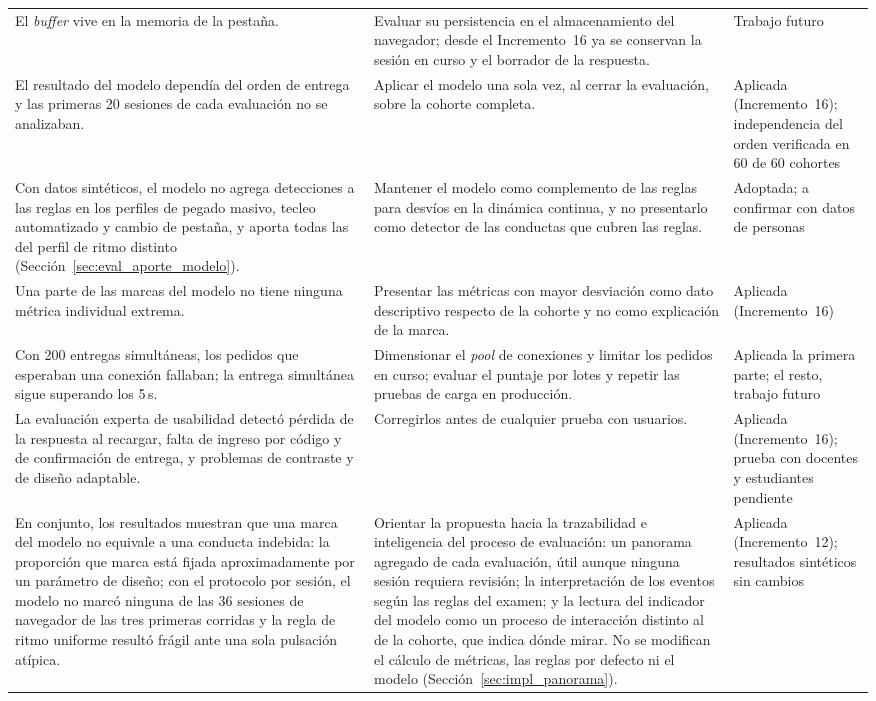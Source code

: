 {\begin{longtable}{>{\raggedright\arraybackslash}p{4.6cm} >{\raggedright\arraybackslash}p{6.4cm} >{\raggedright\arraybackslash}p{2.6cm}}
    El \textit{buffer} vive en la memoria de la pestaña. & Evaluar su persistencia en el almacenamiento del navegador; desde el Incremento~16 ya se conservan la sesión en curso y el borrador de la respuesta. & Trabajo futuro \\
    El resultado del modelo dependía del orden de entrega y las primeras 20 sesiones de cada evaluación no se analizaban. & Aplicar el modelo una sola vez, al cerrar la evaluación, sobre la cohorte completa. & Aplicada (Incremento~16); independencia del orden verificada en 60 de 60 cohortes \\
    Con datos sintéticos, el modelo no agrega detecciones a las reglas en los perfiles de pegado masivo, tecleo automatizado y cambio de pestaña, y aporta todas las del perfil de ritmo distinto (Sección~\ref{sec:eval_aporte_modelo}). & Mantener el modelo como complemento de las reglas para desvíos en la dinámica continua, y no presentarlo como detector de las conductas que cubren las reglas. & Adoptada; a confirmar con datos de personas \\
    Una parte de las marcas del modelo no tiene ninguna métrica individual extrema. & Presentar las métricas con mayor desviación como dato descriptivo respecto de la cohorte y no como explicación de la marca. & Aplicada (Incremento~16) \\
    Con 200 entregas simultáneas, los pedidos que esperaban una conexión fallaban; la entrega simultánea sigue superando los 5\,s. & Dimensionar el \textit{pool} de conexiones y limitar los pedidos en curso; evaluar el puntaje por lotes y repetir las pruebas de carga en producción. & Aplicada la primera parte; el resto, trabajo futuro \\
    La evaluación experta de usabilidad detectó pérdida de la respuesta al recargar, falta de ingreso por código y de confirmación de entrega, y problemas de contraste y de diseño adaptable. & Corregirlos antes de cualquier prueba con usuarios. & Aplicada (Incremento~16); prueba con docentes y estudiantes pendiente \\
    En conjunto, los resultados muestran que una marca del modelo no equivale a una conducta indebida: la proporción que marca está fijada aproximadamente por un parámetro de diseño; con el protocolo por sesión, el modelo no marcó ninguna de las 36 sesiones de navegador de las tres primeras corridas y la regla de ritmo uniforme resultó frágil ante una sola pulsación atípica. & Orientar la propuesta hacia la trazabilidad e inteligencia del proceso de evaluación: un panorama agregado de cada evaluación, útil aunque ninguna sesión requiera revisión; la interpretación de los eventos según las reglas del examen; y la lectura del indicador del modelo como un proceso de interacción distinto al de la cohorte, que indica dónde mirar. No se modifican el cálculo de métricas, las reglas por defecto ni el modelo (Sección~\ref{sec:impl_panorama}). & Aplicada (Incremento~12); resultados sintéticos sin cambios \\
\end{longtable}
}

